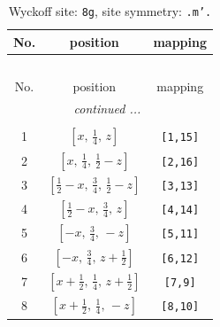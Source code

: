 \documentclass[fleqn,8pt]{jsarticle}
\begin{document}
\begin{longtable}{ccc}
\caption{Wyckoff site: {\tt 8g}, site symmetry: {\tt .m'.}}
 \\
 \hline \hline
No. & position & mapping \\ \hline \endfirsthead

\multicolumn{2}{l}{\tablename\ \thetable{}} \\
 \hline \hline
No. & position & mapping \\ \hline \endhead

 \hline \hline
\multicolumn{2}{r}{\footnotesize\it continued ...} \\ \endfoot

 \hline \hline
\multicolumn{2}{r}{} \\ \endlastfoot

1 & $\left[ x,\, \frac{1}{4},\, z \right]$ & {\tt [1,15]} \\ \hline
2 & $\left[ x,\, \frac{1}{4},\, \frac{1}{2} - z \right]$ & {\tt [2,16]} \\ \hline
3 & $\left[ \frac{1}{2} - x,\, \frac{3}{4},\, \frac{1}{2} - z \right]$ & {\tt [3,13]} \\ \hline
4 & $\left[ \frac{1}{2} - x,\, \frac{3}{4},\, z \right]$ & {\tt [4,14]} \\ \hline
5 & $\left[ - x,\, \frac{3}{4},\, - z \right]$ & {\tt [5,11]} \\ \hline
6 & $\left[ - x,\, \frac{3}{4},\, z + \frac{1}{2} \right]$ & {\tt [6,12]} \\ \hline
7 & $\left[ x + \frac{1}{2},\, \frac{1}{4},\, z + \frac{1}{2} \right]$ & {\tt [7,9]} \\ \hline
8 & $\left[ x + \frac{1}{2},\, \frac{1}{4},\, - z \right]$ & {\tt [8,10]} \\
\end{longtable}
\renewcommand{\arraystretch}{1.2}
\end{document}
